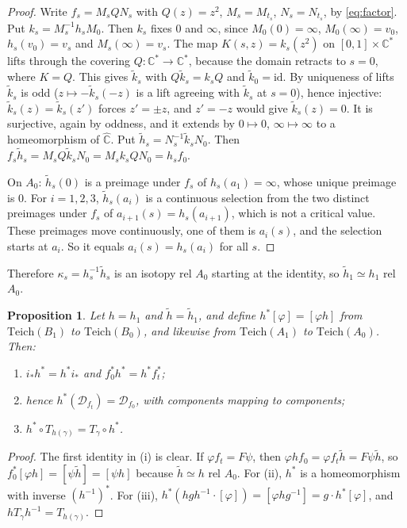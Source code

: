 \documentclass[11pt]{article}
\newtheorem{proposition}{Proposition}[section]
\theoremstyle{definition}
\newcommand{\Teich}{\mathrm{Teich}}
\newcommand{\Ch}{\hat{\mathbb C}}
\newcommand{\D}{\mathcal D}
\begin{document}
\begin{proof}
Write $f_s=M_sQN_s$ with $Q(z)=z^2$, $M_s=M_{t_s}$, $N_s=N_{t_s}$, by \eqref{eq:factor}. Put $k_s=M_s^{-1}h_sM_0$. Then $k_s$ fixes $0$ and $\infty$, since $M_0(0)=\infty$, $M_0(\infty)=v_0$, $h_s(v_0)=v_s$ and $M_s(\infty)=v_s$. The map $K(s,z)=k_s(z^2)$ on $[0,1]\times\mathbb C^*$ lifts through the covering $Q\colon\mathbb C^*\to\mathbb C^*$, because the domain retracts to $s=0$, where $K=Q$. This gives $\tilde k_s$ with $Q\tilde k_s=k_sQ$ and $\tilde k_0=\mathrm{id}$. By uniqueness of lifts $\tilde k_s$ is odd ($z\mapsto-\tilde k_s(-z)$ is a lift agreeing with $\tilde k_s$ at $s=0$), hence injective: $\tilde k_s(z)=\tilde k_s(z')$ forces $z'=\pm z$, and $z'=-z$ would give $\tilde k_s(z)=0$. It is surjective, again by oddness, and it extends by $0\mapsto0$, $\infty\mapsto\infty$ to a homeomorphism of $\Ch$. Put $\tilde h_s=N_s^{-1}\tilde k_sN_0$. Then $f_s\tilde h_s=M_sQ\tilde k_sN_0=M_sk_sQN_0=h_sf_0$.

On $A_0$: $\tilde h_s(0)$ is a preimage under $f_s$ of $h_s(a_1)=\infty$, whose unique preimage is $0$. For $i=1,2,3$, $\tilde h_s(a_i)$ is a continuous selection from the two distinct preimages under $f_s$ of $a_{i+1}(s)=h_s(a_{i+1})$, which is not a critical value. These preimages move continuously, one of them is $a_i(s)$, and the selection starts at $a_i$. So it equals $a_i(s)=h_s(a_i)$ for all $s$.
\end{proof}

Therefore $\kappa_s=h_s^{-1}\tilde h_s$ is an isotopy rel $A_0$ starting at the identity, so $\tilde h_1\simeq h_1$ rel $A_0$.

\begin{proposition}\label{prop:transport}
Let $h=h_1$ and $\tilde h=\tilde h_1$, and define $h^*[\varphi]=[\varphi h]$ from $\Teich(B_1)$ to $\Teich(B_0)$, and likewise from $\Teich(A_1)$ to $\Teich(A_0)$. Then:
\begin{enumerate}[label=\textup{(\roman*)},nosep]
\item $i_*h^*=h^*i_*$ and $f_0^*h^*=h^*f_t^*$;
\item hence $h^*(\D_{f_t})=\D_{f_0}$, with components mapping to components;
\item $h^*\circ T_{h(\gamma)}=T_\gamma\circ h^*$.
\end{enumerate}
\end{proposition}

\begin{proof}
The first identity in (i) is clear. If $\varphi f_t=F\psi$, then $\varphi hf_0=\varphi f_t\tilde h=F\psi\tilde h$, so $f_0^*[\varphi h]=[\psi\tilde h]=[\psi h]$ because $\tilde h\simeq h$ rel $A_0$. For (ii), $h^*$ is a homeomorphism with inverse $(h^{-1})^*$. For (iii), $h^*(hgh^{-1}\cdot[\varphi])=[\varphi hg^{-1}]=g\cdot h^*[\varphi]$, and $hT_\gamma h^{-1}=T_{h(\gamma)}$.
\end{proof}
\end{document}
